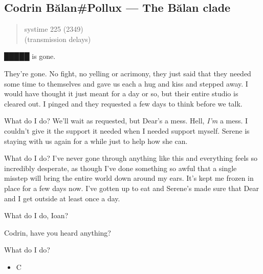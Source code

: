 \hypertarget{codrin-bux103lanpollux-the-bux103lan-clade}{%
\subsection{Codrin Bălan\#Pollux — The Bălan clade}\label{codrin-bux103lanpollux-the-bux103lan-clade}}

\begin{quote}
systime 225 (2349)\\
(transmission delays)
\end{quote}

█████ is gone.

They're gone. No fight, no yelling or acrimony, they just said that they needed some time to themselves and gave us each a hug and kiss and stepped away. I would have thought it just meant for a day or so, but their entire studio is cleared out. I pinged and they requested a few days to think before we talk.

What do I do? We'll wait as requested, but Dear's a mess. Hell, \emph{I'm} a mess. I couldn't give it the support it needed when I needed support myself. Serene is staying with us again for a while just to help how she can.

What do I do? I've never gone through anything like this and everything feels so incredibly desperate, as though I've done something so awful that a single misstep will bring the entire world down around my ears. It's kept me frozen in place for a few days now. I've gotten up to eat and Serene's made sure that Dear and I get outside at least once a day.

What do I do, Ioan?

Codrin, have you heard anything?

What do I do?

\begin{itemize}
\tightlist
\item
  C
\end{itemize}
